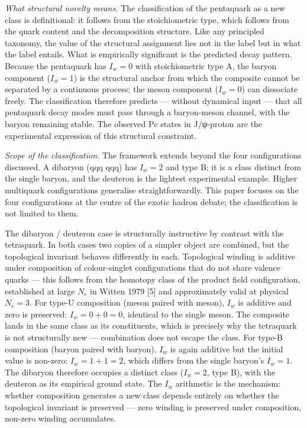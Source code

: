 \documentclass[12pt,a4paper]{article}
\begin{document}
\emph{What structural novelty means.} The classification of the
pentaquark as a new class is definitional: it follows from
the stoichiometric type, which follows from the quark content and the
decomposition structure. Like any principled taxonomy, the value of the
structural assignment lies not in the label but in what the label
entails. What is empirically significant is the predicted decay pattern.
Because the pentaquark has \(I_w = 0\) with stoichiometric type A, the
baryon component (\(I_w = 1\)) is the structural anchor from which the
composite cannot be separated by a continuous process; the meson
component (\(I_w = 0\)) can dissociate freely. The classification
therefore predicts --- without dynamical input --- that all pentaquark
decay modes must pass through a baryon-meson channel, with the baryon
remaining stable. The observed Pc states in J/ψ-proton are the
experimental expression of this structural constraint.

\emph{Scope of the classification.} The framework extends beyond the
four configurations discussed. A dibaryon (qqq qqq) has \(I_w = 2\) and
type B; it is a class distinct from the single baryon, and
the deuteron is the lightest experimental example. Higher multiquark
configurations generalise straightforwardly. This paper focuses on the
four configurations at the centre of the exotic hadron debate; the
classification is not limited to them.

The dibaryon / deuteron case is structurally instructive by contrast
with the tetraquark. In both cases two copies of a simpler object are
combined, but the topological invariant behaves differently in each.
Topological winding is additive under composition of colour-singlet
configurations that do not share valence quarks --- this follows from
the homotopy class of the product field configuration, established at
large \(N_c\) in Witten 1979 {[}5{]} and approximately valid at physical
\(N_c = 3\). For type-U composition (meson paired with meson), \(I_w\)
is additive and zero is preserved: \(I_w = 0 + 0 = 0\), identical to the
single meson. The composite lands in the same class as its
constituents, which is precisely why the tetraquark is not structurally
new --- combination does not escape the class. For type-B
composition (baryon paired with baryon), \(I_w\) is again additive but
the initial value is non-zero: \(I_w = 1 + 1 = 2\), which differs from
the single baryon's \(I_w = 1\). The dibaryon therefore occupies a
distinct class (\(I_w = 2\), type B), with the deuteron as
its empirical ground state. The \(I_w\) arithmetic is the mechanism:
whether composition generates a new class depends entirely on
whether the topological invariant is preserved --- zero winding is
preserved under composition, non-zero winding accumulates.
\end{document}
